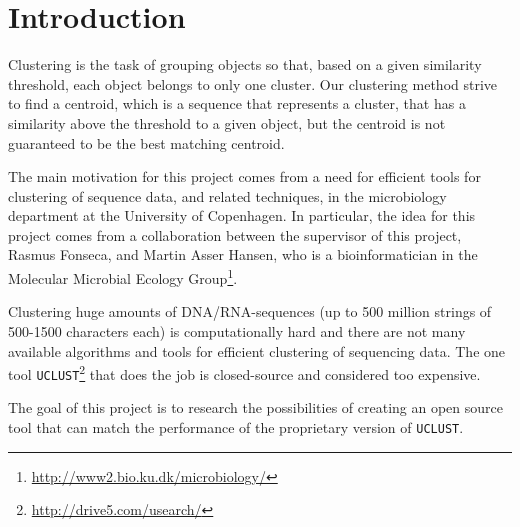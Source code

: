 \section{Introduction}
Clustering is the task of grouping objects so that, based on a given similarity
threshold, each object belongs to only one cluster. Our clustering method strive to find a centroid, which is a sequence that represents a cluster, that has a similarity above the threshold to a given object, but the centroid is not guaranteed to be the best matching centroid.

The main motivation for this project comes from a need for efficient tools for
clustering of sequence data, and related techniques, in the microbiology
department at the University of Copenhagen. In particular, the idea for this
project comes from a collaboration between the supervisor of this project,
Rasmus Fonseca, and Martin Asser Hansen, who is a bioinformatician in the
Molecular Microbial Ecology
Group\footnote{\url{http://www2.bio.ku.dk/microbiology/}}.

Clustering huge amounts of DNA/RNA-sequences (up to 500
million strings of 500-1500 characters each) is computationally hard and there are not many available algorithms and tools for efficient clustering of
sequencing data. The one tool
\texttt{UCLUST}\footnote{\url{http://drive5.com/usearch/}} that does the job is
closed-source and considered too expensive.

The goal of this project is to research the possibilities of creating an open source tool that can match the performance of the proprietary version of
\texttt{UCLUST}.

